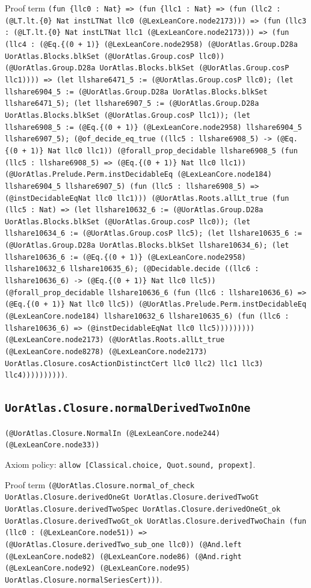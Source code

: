 \documentclass[11pt]{article}
\begin{document}
\noindent Proof term \texttt{(fun \{llc0 : Nat\} => (fun \{llc1 : Nat\} => (fun (llc2 : (@LT.lt.\{0\} Nat instLTNat llc0 (@LexLeanCore.node2173))) => (fun (llc3 : (@LT.lt.\{0\} Nat instLTNat llc1 (@LexLeanCore.node2173))) => (fun (llc4 : (@Eq.\{(0 + 1)\} (@LexLeanCore.node2958) (@UorAtlas.Group.D28a UorAtlas.Blocks.blkSet (@UorAtlas.Group.cosP llc0)) (@UorAtlas.Group.D28a UorAtlas.Blocks.blkSet (@UorAtlas.Group.cosP llc1)))) => (let llshare6471\_5 := (@UorAtlas.Group.cosP llc0); (let llshare6904\_5 := (@UorAtlas.Group.D28a UorAtlas.Blocks.blkSet llshare6471\_5); (let llshare6907\_5 := (@UorAtlas.Group.D28a UorAtlas.Blocks.blkSet (@UorAtlas.Group.cosP llc1)); (let llshare6908\_5 := (@Eq.\{(0 + 1)\} (@LexLeanCore.node2958) llshare6904\_5 llshare6907\_5); (@of\_decide\_eq\_true ((llc5 : llshare6908\_5) -> (@Eq.\{(0 + 1)\} Nat llc0 llc1)) (@forall\_prop\_decidable llshare6908\_5 (fun (llc5 : llshare6908\_5) => (@Eq.\{(0 + 1)\} Nat llc0 llc1)) (@UorAtlas.Prelude.Perm.instDecidableEq (@LexLeanCore.node184) llshare6904\_5 llshare6907\_5) (fun (llc5 : llshare6908\_5) => (@instDecidableEqNat llc0 llc1))) (@UorAtlas.Roots.allLt\_true (fun (llc5 : Nat) => (let llshare10632\_6 := (@UorAtlas.Group.D28a UorAtlas.Blocks.blkSet (@UorAtlas.Group.cosP llc0)); (let llshare10634\_6 := (@UorAtlas.Group.cosP llc5); (let llshare10635\_6 := (@UorAtlas.Group.D28a UorAtlas.Blocks.blkSet llshare10634\_6); (let llshare10636\_6 := (@Eq.\{(0 + 1)\} (@LexLeanCore.node2958) llshare10632\_6 llshare10635\_6); (@Decidable.decide ((llc6 : llshare10636\_6) -> (@Eq.\{(0 + 1)\} Nat llc0 llc5)) (@forall\_prop\_decidable llshare10636\_6 (fun (llc6 : llshare10636\_6) => (@Eq.\{(0 + 1)\} Nat llc0 llc5)) (@UorAtlas.Prelude.Perm.instDecidableEq (@LexLeanCore.node184) llshare10632\_6 llshare10635\_6) (fun (llc6 : llshare10636\_6) => (@instDecidableEqNat llc0 llc5))))))))) (@LexLeanCore.node2173) (@UorAtlas.Roots.allLt\_true (@LexLeanCore.node8278) (@LexLeanCore.node2173) UorAtlas.Closure.cosActionDistinctCert llc0 llc2) llc1 llc3) llc4))))))))))}.\par
\subsection*{\texttt{UorAtlas.Closure.normalDerivedTwoInOne}}
\noindent\texttt{(@UorAtlas.Closure.NormalIn (@LexLeanCore.node244) (@LexLeanCore.node33))}\par
\noindent Axiom policy: \texttt{allow [Classical.choice, Quot.sound, propext]}.\par
\noindent Proof term \texttt{(@UorAtlas.Closure.normal\_of\_check UorAtlas.Closure.derivedOneGt UorAtlas.Closure.derivedTwoGt UorAtlas.Closure.derivedTwoSpec UorAtlas.Closure.derivedOneGt\_ok UorAtlas.Closure.derivedTwoGt\_ok UorAtlas.Closure.derivedTwoChain (fun (llc0 : (@LexLeanCore.node51)) => (@UorAtlas.Closure.derivedTwo\_sub\_one llc0)) (@And.left (@LexLeanCore.node82) (@LexLeanCore.node86) (@And.right (@LexLeanCore.node92) (@LexLeanCore.node95) UorAtlas.Closure.normalSeriesCert)))}.\par
\end{document}
